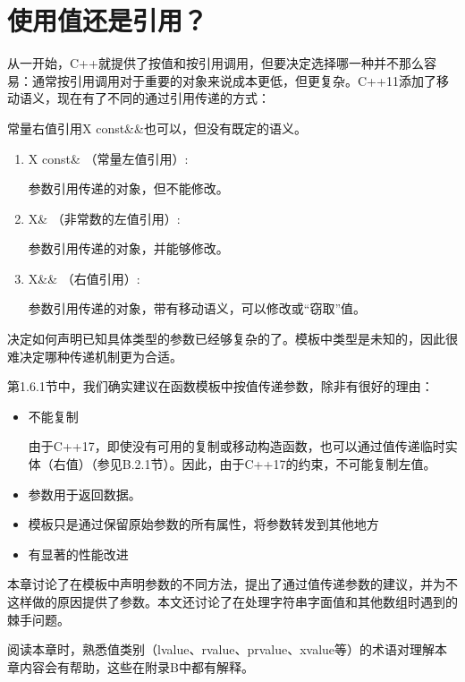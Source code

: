 \chapter{使用值还是引用？}
从一开始，C++就提供了按值和按引用调用，但要决定选择哪一种并不那么容易：通常按引用调用对于重要的对象来说成本更低，但更复杂。C++11添加了移动语义，现在有了不同的通过引用传递的方式：

\begin{notice}
常量右值引用X const\&\&也可以，但没有既定的语义。
\end{notice}

\begin{enumerate}
\item 
X const\& （常量左值引用）:

参数引用传递的对象，但不能修改。

\item 
X\& （非常数的左值引用）:

参数引用传递的对象，并能够修改。

\item 
X\&\& （右值引用）:

参数引用传递的对象，带有移动语义，可以修改或“窃取”值。
\end{enumerate}

决定如何声明已知具体类型的参数已经够复杂的了。模板中类型是未知的，因此很难决定哪种传递机制更为合适。

第1.6.1节中，我们确实建议在函数模板中按值传递参数，除非有很好的理由：

\begin{itemize}
\item 
不能复制

\begin{notice}
由于C++17，即使没有可用的复制或移动构造函数，也可以通过值传递临时实体（右值）（参见B.2.1节）。因此，由于C++17的约束，不可能复制左值。
\end{notice}

\item 
参数用于返回数据。

\item 
模板只是通过保留原始参数的所有属性，将参数转发到其他地方

\item 
有显著的性能改进
\end{itemize}

本章讨论了在模板中声明参数的不同方法，提出了通过值传递参数的建议，并为不这样做的原因提供了参数。本文还讨论了在处理字符串字面值和其他数组时遇到的棘手问题。

阅读本章时，熟悉值类别（lvalue、rvalue、prvalue、xvalue等）的术语对理解本章内容会有帮助，这些在附录B中都有解释。




































